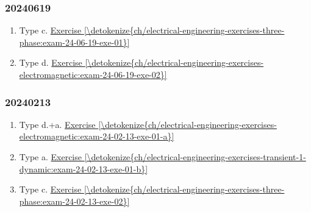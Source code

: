 \documentclass[letterpaper,10pt,english]{jupyterBook}
\begin{document}
\subsubsection*{2024\sphinxhyphen{}06\sphinxhyphen{}19}
\begin{enumerate}
%
\item {} 
\sphinxAtStartPar
Type c. \hyperref[\detokenize{ch/electrical-engineering-exercises-three-phase:exam-24-06-19-exe-01}]{Exercise \ref{\detokenize{ch/electrical-engineering-exercises-three-phase:exam-24-06-19-exe-01}}}

\item {} 
\sphinxAtStartPar
Type d. \hyperref[\detokenize{ch/electrical-engineering-exercises-electromagnetic:exam-24-06-19-exe-02}]{Exercise \ref{\detokenize{ch/electrical-engineering-exercises-electromagnetic:exam-24-06-19-exe-02}}}

\end{enumerate}
\subsubsection*{2024\sphinxhyphen{}02\sphinxhyphen{}13}
\begin{enumerate}
%
\item {} 
\sphinxAtStartPar
Type d.+a. \hyperref[\detokenize{ch/electrical-engineering-exercises-electromagnetic:exam-24-02-13-exe-01-a}]{Exercise \ref{\detokenize{ch/electrical-engineering-exercises-electromagnetic:exam-24-02-13-exe-01-a}}}

\item {} 
\sphinxAtStartPar
Type a.    \hyperref[\detokenize{ch/electrical-engineering-exercises-transient-1-dynamic:exam-24-02-13-exe-01-b}]{Exercise \ref{\detokenize{ch/electrical-engineering-exercises-transient-1-dynamic:exam-24-02-13-exe-01-b}}}

\item {} 
\sphinxAtStartPar
Type c.    \hyperref[\detokenize{ch/electrical-engineering-exercises-three-phase:exam-24-02-13-exe-02}]{Exercise \ref{\detokenize{ch/electrical-engineering-exercises-three-phase:exam-24-02-13-exe-02}}}

\end{enumerate}

\sphinxstepscope
\end{document}
